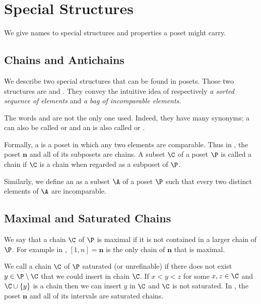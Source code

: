 \section{Special Structures}

We give names to special structures and properties a poset might carry.

\subsection{Chains and Antichains}

We describe two special structures that can be found in
posets. Those two structures are  and .
They convey the intuitive idea of respectively \emph{a sorted sequence of
elements} and \emph{a bag of incomparable elements}.

The words  and  are not the only one used.
Indeed, they have many synonyms; a  can also be called
 or  and an
 is also called  or
.


Formally, a  is a poset in which any two elements are
comparable. Thus in , the poset $\bm{n}$ and all of its
subposets are chains. A subset $\C$ of a poset $\P$ is called a chain if $\C$ is a
chain when regarded as a subposet of $\P$.

Similarly, we define an  as a subset $\A$ of a poset $\P$ such
that every two distinct elements of $\A$ are incomparable.

\subsection{Maximal and Saturated Chains}

We say that a chain \(\C\) of \(\P\) is maximal if it is not contained in a larger
chain of $\P$. For example in , $[1, n] = \bm{n}$ is the
only chain of $\bm{n}$ that is maximal.

We call a chain $\C$ of $\P$ saturated (or unrefinable) if there does not exist
$y \in \P \setminus \C$ that we could insert in chain $\C$. If $x < y < z$ for
some $x, z \in \C$ and $\C \cup \left\{{y}\right\}$ is a chain then we can insert
$y$ in $\C$ and $\C$ is not saturated. In , the poset
$\bm{n}$ and all of its intervals are saturated chains.

